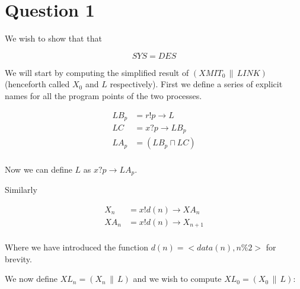 \documentclass[a4paper, 10pt]{article}
\newcommand{\conc}{\, \| \,}
\begin{document}
\maketitle
\newpage
\tableofcontents
\newpage

\section{Question 1}

We wish to show that that 

\begin{equation*}
  SYS = DES
\end{equation*}

We will start by computing the simplified result of $(XMIT_0 \conc
LINK)$ (henceforth called $X_0$ and $L$ respectively). First we define a
series of explicit names for all the program points of the two
processes.

\begin{align*}
  LB_p &= r!p \to L \\
  LC &= x?p \to LB_p \\
  LA_p &= (LB_p \sqcap LC) \\
\end{align*}

Now we can define $L$ as $x?p \to LA_p$.

Similarly

\begin{align*}
  X_n &= x!d(n) \to XA_n \\
  XA_n &= x!d(n) \to X_{n+1} \\
\end{align*}

Where we have introduced the function $d(n) = <data(n), n \% 2>$ for
brevity.

We now define $XL_n = (X_n \conc L)$ and we wish to compute $XL_0 = (X_0 \conc L)$:
\end{document}
